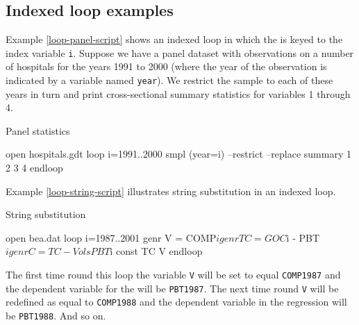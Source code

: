 \subsection{Indexed loop examples}


Example \ref{loop-panel-script} shows an indexed loop in which the
 is keyed to the index variable \verb+i+.  Suppose we have a
panel dataset with observations on a number of hospitals for the years
1991 to 2000 (where the year of the observation is indicated by a
variable named \verb+year+).  We restrict the sample to each of these
years in turn and print cross-sectional summary statistics for
variables 1 through 4.

\begin{script}[htbp]
  \caption{Panel statistics}
  \label{loop-panel-script}
\begin{code}
	  open hospitals.gdt
	  loop i=1991..2000
	    smpl (year=i) --restrict --replace
	    summary 1 2 3 4
	  endloop
\end{code}
\end{script}


Example \ref{loop-string-script} illustrates string substitution in an
indexed loop.

\begin{script}[htbp]
  \caption{String substitution}
  \label{loop-string-script}
\begin{code}
	  open bea.dat
	  loop i=1987..2001
	    genr V = COMP$i
	    genr TC = GOC$i - PBT$i
	    genr C = TC - V
	    ols PBT$i const TC V
	  endloop
\end{code}
\end{script}

The first time round this loop the variable \verb+V+ will be set to
equal \verb+COMP1987+ and the dependent variable for the 
will be \verb+PBT1987+. The next time round \verb+V+ will be redefined
as equal to \verb+COMP1988+ and the dependent variable in the
regression will be \verb+PBT1988+.  And so on.


